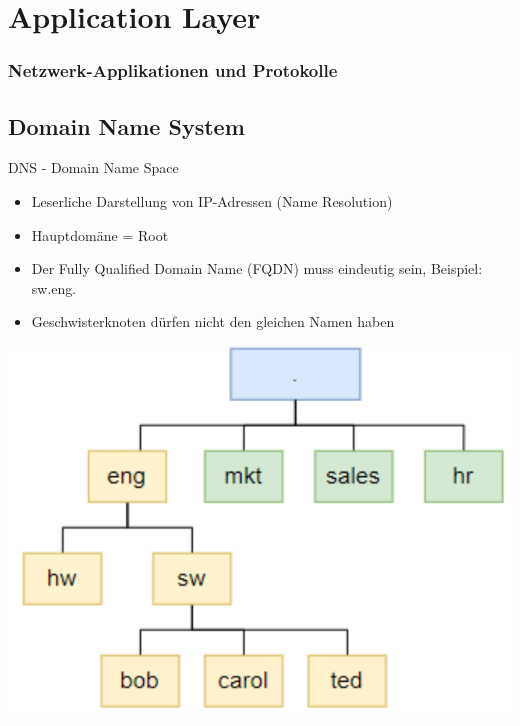 \section{Application Layer}

\subsubsection{Netzwerk-Applikationen und Protokolle}

\subsection{Domain Name System}

\begin{definition}{DNS - Domain Name Space}
    \begin{itemize}
        \item Leserliche Darstellung von IP-Adressen (Name Resolution)
        \item Hauptdomäne = Root
        \item Der Fully Qualified Domain Name (FQDN) muss eindeutig sein, Beispiel: sw.eng.
        \item Geschwisterknoten dürfen nicht den gleichen Namen haben
    \end{itemize}
        \includegraphics[width=0.5\linewidth]{images/dns.png}
\end{definition}

